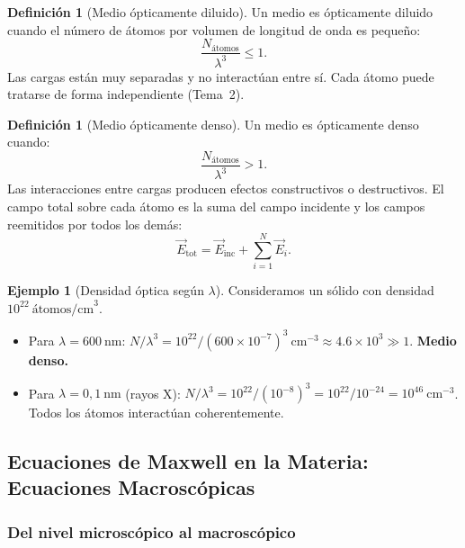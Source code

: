 \documentclass[12pt, a4paper]{article}
\theoremstyle{plain}
\theoremstyle{definition}
\newtheorem{definicion}[teorema]{Definición}
\newtheorem{ejemplo}{Ejemplo}[section]
\theoremstyle{remark}
\newcommand{\ve}[1]{\vec{#1}}
\begin{document}
\begin{definicion}[Medio ópticamente diluido]
Un medio es ópticamente diluido cuando el número de átomos por volumen de
longitud de onda es pequeño:
\[
  \frac{N_\text{átomos}}{\lambda^3} \leq 1.
\]
Las cargas están muy separadas y no interactúan entre sí. Cada átomo puede
tratarse de forma independiente (Tema~2).
\end{definicion}

\begin{definicion}[Medio ópticamente denso]
Un medio es ópticamente denso cuando:
\[
  \frac{N_\text{átomos}}{\lambda^3} > 1.
\]
Las interacciones entre cargas producen efectos constructivos o destructivos.
El campo total sobre cada átomo es la suma del campo incidente y los campos
reemitidos por todos los demás:
\begin{equation}
  \ve{E}_\text{tot} = \ve{E}_\text{inc} + \sum_{i=1}^{N} \ve{E}_i.
  \label{eq:campo_total}
\end{equation}
\end{definicion}

\begin{ejemplo}[Densidad óptica según $\lambda$]
Consideramos un sólido con densidad $10^{22}\ \text{átomos/cm}^3$.

\begin{itemize}
  \item Para $\lambda = 600\ \text{nm}$:
        $N/\lambda^3 = 10^{22}/(600\times10^{-7})^3\ \text{cm}^{-3}
        \approx 4.6\times10^{3} \gg 1$. \textbf{Medio denso.}
  \item Para $\lambda = 0{,}1\ \text{nm}$ (rayos X):
        $N/\lambda^3 = 10^{22}/(10^{-8})^3 = 10^{22}/10^{-24}
        = 10^{46}\ \text{cm}^{-3}$.
        Todos los átomos interactúan coherentemente.
\end{itemize}
\end{ejemplo}

\subsection{Ecuaciones de Maxwell en la Materia: Ecuaciones Macroscópicas}

\subsubsection{Del nivel microscópico al macroscópico}
\end{document}
